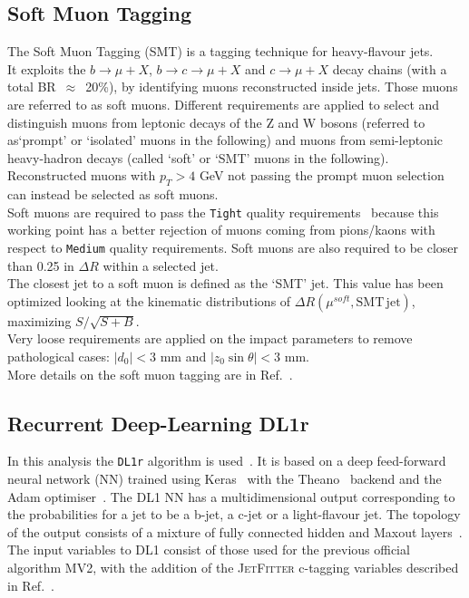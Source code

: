 \subsection{Soft Muon Tagging}
\label{sec:object:soft_muons}
\label{sec:object:smt}
The Soft Muon Tagging (SMT) is a tagging technique for heavy-flavour jets.\\
It exploits the $b \rightarrow \mu + X$,
$b \rightarrow c \rightarrow \mu + X$ and $c \rightarrow \mu + X$ decay chains (with a total BR~$\approx$~20\%), by identifying muons reconstructed inside jets. Those muons are referred to as soft muons.
Different requirements are applied to select and distinguish muons 
from leptonic decays of the Z and W bosons 
(referred to as`prompt' or `isolated' muons in the following) 
and muons from semi-leptonic heavy-hadron decays 
(called `soft' or `SMT' muons in the following). \\
Reconstructed muons with $p_{T} > 4 $ GeV not passing 
the prompt muon selection can instead be selected as soft muons.\\
Soft muons are required to pass the \texttt{Tight} quality requirements~\cite{muon2015}
because this working point has a better rejection of muons coming from pions/kaons with respect to \texttt{Medium} quality requirements.
Soft muons are also required to be closer than 0.25 in $\Delta R$ within a selected jet.\\
The closest jet to a soft muon is defined as the `SMT' jet. 
This value has been optimized looking at the kinematic distributions of $\Delta R(\mu^{soft}, \mathrm{SMT\, jet})$, maximizing $S/\sqrt{S+B}$.\\
Very loose requirements are applied on the impact parameters to remove
pathological cases: 
$|d_0| < 3$ mm and $|z_0 \sin\theta| < 3$  mm.\\
More details on the soft muon tagging are in Ref.~\cite{SMT-INT-13TeV}.

\subsection{Recurrent Deep-Learning DL1r}
In this analysis the \texttt{DL1r} algorithm is used~\cite{ATL-PHYS-PUB-2017-013,Aad:2019aic}.
It is based on a deep feed-forward neural network (NN) trained using Keras~\cite{keras} with the Theano~\cite{theano} backend and the Adam optimiser~\cite{adam}. The DL1 NN has a multidimensional output corresponding to the probabilities for a jet to be a b-jet, a c-jet or a light-flavour jet. The topology of the output consists of a mixture of fully connected hidden and Maxout layers~\cite{goodfellow2013maxout}. The input variables to DL1 consist of those used for the previous official algorithm MV2, with the addition of the \textsc{JetFitter} c-tagging variables described in Ref.~\cite{Aad:2019aic}.
